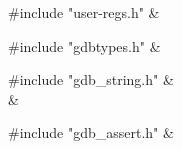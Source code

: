 \medskip
\begin{cxreftabi}
{\stt \#include "user-regs.h"} &\\
\end{cxreftabi}

\medskip
\begin{cxreftabi}
{\stt \#include "gdbtypes.h"} &\\
\end{cxreftabi}

\medskip
\begin{cxreftabi}
{\stt \#include "gdb\_string.h"} &\\
\hspace*{0.2in}{\stt \#include <string.h>} &\\
\end{cxreftabi}

\medskip
\begin{cxreftabi}
{\stt \#include "gdb\_assert.h"} &\\
\end{cxreftabi}

